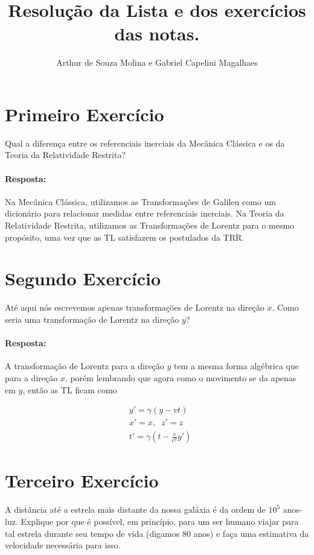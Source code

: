 \documentclass[10pt,a4paper]{article}
\author{Arthur de Souza Molina e Gabriel Capelini Magalhaes}
\title{Resolução da Lista e dos exercícios das notas.}
\begin{document}
	\maketitle
	\section{Primeiro Exercício}
	Qual a diferença entre os referenciais inerciais da Mecânica Clássica e os da Teoria da Relatividade Restrita?
	
	\paragraph{Resposta:}
	Na Mecânica Clássica, utilizamos as Transformações de Galileu como um dicionário para relacionar medidas entre referenciais inerciais. Na Teoria da Relatividade Restrita, utilizamos as Transformações de Lorentz para o mesmo propósito, uma vez que as TL satisfazem os postulados da TRR.
	
	
	\section{Segundo Exercício}
	Até aqui nós escrevemos apenas transformações de Lorentz na direção \(x\).
	Como seria uma transformação de Lorentz na direção \(y\)?	
	\paragraph{Resposta:}
	A transformação de Lorentz para a direção \(y\) tem a mesma forma algébrica que para a direção \(x\), porém lembrando que agora como o movimento se da apenas em \(y\), então as TL ficam como
	
	\begin{equation}
		\begin{split}
			& y' = \gamma(y-vt) \\
			& x'=x, \;\; z'=z \\
			& t' = \gamma\left(t-\frac{v}{c^2}y'\right)
		\end{split}
	\end{equation}
	
	\section{Terceiro Exercício}
	A distância até a estrela mais distante da nossa galáxia é da ordem de $10^{5}$ anos-luz. Explique por que é possível, em princípio, para um ser humano viajar para tal estrela durante seu tempo de vida (digamos 80 anos) e faça uma estimativa da velocidade necessária para isso.
\end{document}
